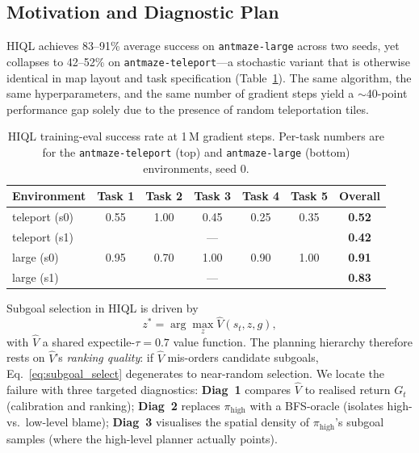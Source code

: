 \documentclass[11pt]{article}
\begin{document}
\subsection{Motivation and Diagnostic Plan}
\label{subsec:motivation}

HIQL achieves 83--91\% average success on \texttt{antmaze-large} across two
seeds, yet collapses to 42--52\% on \texttt{antmaze-teleport}---a
stochastic variant that is otherwise identical in map layout and task
specification (Table~\ref{tab:training_eval}).
The same algorithm, the same hyperparameters, and the same number of gradient
steps yield a $\sim$40-point performance gap solely due to the presence of
random teleportation tiles.

\begin{table}[h]
  \centering
  \caption{HIQL training-eval success rate at 1\,M gradient steps.
           Per-task numbers are for the \texttt{antmaze-teleport} (top) and
           \texttt{antmaze-large} (bottom) environments, seed 0.}
  \label{tab:training_eval}
  \small
  \begin{tabular}{lcccccc}
    \toprule
    Environment & Task 1 & Task 2 & Task 3 & Task 4 & Task 5 & \textbf{Overall} \\
    \midrule
    teleport (s0) & 0.55 & 1.00 & 0.45 & 0.25 & 0.35 & \textbf{0.52} \\
    teleport (s1) & \multicolumn{5}{c}{---} & \textbf{0.42} \\
    \midrule
    large (s0)    & 0.95 & 0.70 & 1.00 & 0.90 & 1.00 & \textbf{0.91} \\
    large (s1)    & \multicolumn{5}{c}{---} & \textbf{0.83} \\
    \bottomrule
  \end{tabular}
\end{table}

Subgoal selection in HIQL is driven by
\begin{equation}
  z^* = \arg\max_{z} \hat{V}(s_t, z, g),
  \label{eq:subgoal_select}
\end{equation}
with $\hat{V}$ a shared expectile-$\tau{=}0.7$ value function.
The planning hierarchy therefore rests on $\hat{V}$'s \emph{ranking
quality}: if $\hat{V}$ mis-orders candidate subgoals,
Eq.~\eqref{eq:subgoal_select} degenerates to near-random selection.
We locate the failure with three targeted diagnostics: \textbf{Diag~1}
compares $\hat{V}$ to realised return $G_t$ (calibration and ranking);
\textbf{Diag~2} replaces $\pi_\text{high}$ with a BFS-oracle (isolates
high- vs.\ low-level blame); \textbf{Diag~3} visualises the spatial
density of $\pi_\text{high}$'s subgoal samples (where the high-level
planner actually points).
\end{document}
